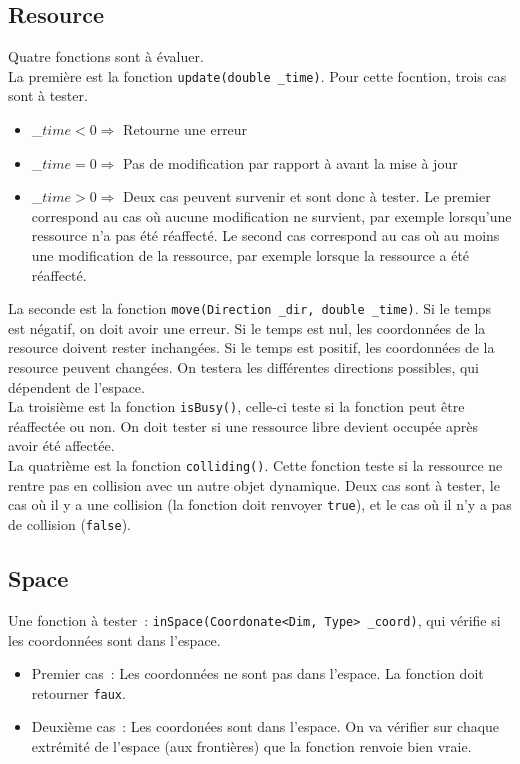 \subsection{Resource}

Quatre fonctions sont à évaluer.\\

La première est la fonction \texttt{update(double \_time)}. Pour cette focntion, trois cas sont à tester.
\begin{itemize}
\item \_$time < 0 \Rightarrow$ Retourne une erreur
\item \_$time = 0 \Rightarrow$ Pas de modification par rapport à avant la mise à jour
\item \_$time > 0 \Rightarrow$ Deux cas peuvent survenir et sont donc à tester. Le premier correspond au cas où aucune modification ne survient, par exemple lorsqu'une ressource n'a pas été réaffecté. Le second cas correspond au cas où au moins une modification de la ressource, par exemple lorsque la ressource a été réaffecté.\\
\end{itemize}

La seconde est la fonction \texttt{move(Direction \_dir, double \_time)}.
Si le temps est négatif, on doit avoir une erreur. Si le temps est nul, les coordonnées de la resource doivent rester inchangées. Si le temps est positif, les coordonnées de la resource peuvent changées. On testera les différentes directions possibles, qui dépendent de l'espace. \\

La troisième est la fonction \texttt{isBusy()}, celle-ci teste si la fonction peut être réaffectée ou non. On doit tester si une ressource libre devient occupée après avoir été affectée.\\

La quatrième est la fonction \texttt{colliding()}. Cette fonction teste si la ressource ne rentre pas en collision avec un autre objet dynamique. Deux cas sont à tester, le cas où il y a une collision (la fonction doit renvoyer \texttt{true}), et le cas où il n'y a pas de collision (\texttt{false}).

\subsection{Space}

Une fonction à tester~: \texttt{inSpace(Coordonate<Dim, Type> \_coord)}, qui vérifie si les coordonnées sont dans l'espace.
\begin{itemize}
\item Premier cas~: Les coordonnées ne sont pas dans l'espace. La fonction doit retourner \texttt{faux}.
\item Deuxième cas~: Les coordonées sont dans l'espace. On va vérifier sur chaque extrémité de l'espace (aux frontières) que la fonction renvoie bien vraie.
\end{itemize}

